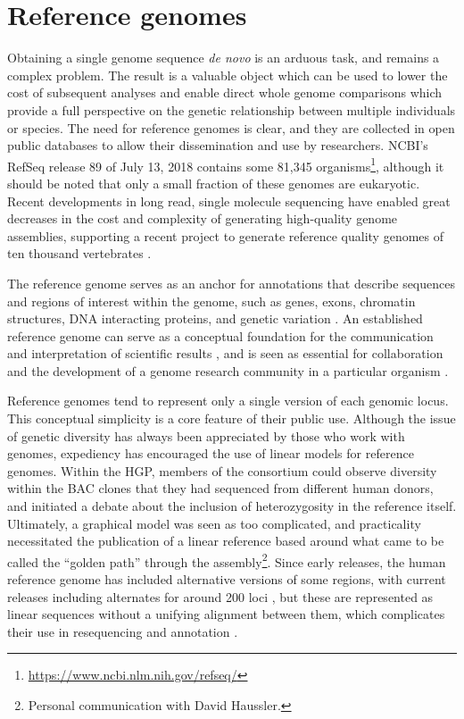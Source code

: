 \section{Reference genomes}
\label{sec:reference_genomes}

Obtaining a single genome sequence \emph{de novo} is an arduous task, and remains a complex problem.
The result is a valuable object which can be used to lower the cost of subsequent analyses and enable direct whole genome comparisons which provide a full perspective on the genetic relationship between multiple individuals or species.
The need for reference genomes is clear, and they are collected in open public databases to allow their dissemination and use by researchers.
NCBI's RefSeq release 89 of July 13, 2018 contains some 81,345 organisms\footnote{\url{https://www.ncbi.nlm.nih.gov/refseq/}}, although it should be noted that only a small fraction of these genomes are eukaryotic.
Recent developments in long read, single molecule sequencing have enabled great decreases in the cost and complexity of generating high-quality genome assemblies, supporting a recent project to generate reference quality genomes of ten thousand vertebrates \cite{genome2009genome,koepfli2015genome}.

The reference genome serves as an anchor for annotations that describe sequences and regions of interest within the genome, such as genes, exons, chromatin structures, DNA interacting proteins, and genetic variation \cite{sherry2001dbsnp,quinlan2010bedtools,encode2012integrated}.
An established reference genome can serve as a conceptual foundation for the communication and interpretation of scientific results \cite{kent2002human}, and is seen as essential for collaboration and the development of a genome research community in a particular organism \cite{smith1998functional,cherry1998sgd}.

Reference genomes tend to represent only a single version of each genomic locus.
This conceptual simplicity is a core feature of their public use.
Although the issue of genetic diversity has always been appreciated by those who work with genomes, expediency has encouraged the use of linear models for reference genomes.
Within the HGP, members of the consortium could observe diversity within the BAC clones that they had sequenced from different human donors, and initiated a debate about the inclusion of heterozygosity in the reference itself.
Ultimately, a graphical model was seen as too complicated, and practicality necessitated the publication of a linear reference based around what came to be called the ``golden path'' through the assembly\footnote{Personal communication with David Haussler.}.
Since early releases, the human reference genome has included alternative versions of some regions, with current releases including alternates for around 200 loci \cite{schneider2017evaluation,church2018genomes}, but these are represented as linear sequences without a unifying alignment between them, which complicates their use in resequencing and annotation \cite{jager2016alternate}.

